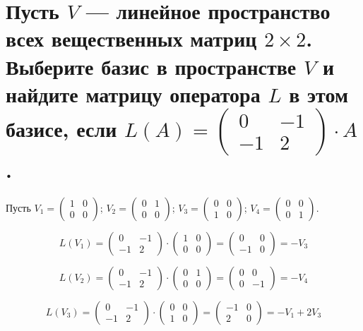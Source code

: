 \documentclass[12pt]{article}
\begin{document}
\begin{sloppypar}
    \section{Пусть $V$ — линейное пространство всех вещественных матриц $2 \times 2$. Выберите базис в пространстве $V$ и найдите матрицу оператора $L$ в этом базисе, если $L(A) = \begin{pmatrix}0 & -1 \\ -1 & 2\end{pmatrix} \cdot A$.}

    Пусть $V_1 = \begin{pmatrix} 1 & 0 \\ 0 & 0 \end{pmatrix}$;
    $V_2 = \begin{pmatrix} 0 & 1 \\ 0 & 0 \end{pmatrix}$;
    $V_3 = \begin{pmatrix} 0 & 0 \\ 1 & 0 \end{pmatrix}$;
    $V_4 = \begin{pmatrix} 0 & 0 \\ 0 & 1 \end{pmatrix}$.

    \[
        L(V_1) = \begin{pmatrix} 0 & -1 \\ -1 & 2 \end{pmatrix} \cdot \begin{pmatrix} 1 & 0 \\ 0 & 0 \end{pmatrix}
        = \begin{pmatrix}
            0  & 0 \\
            -1 & 0
        \end{pmatrix}
        = -V_3
    \]

    \[
        L(V_2) = \begin{pmatrix} 0 & -1 \\ -1 & 2 \end{pmatrix} \cdot \begin{pmatrix} 0 & 1 \\ 0 & 0 \end{pmatrix}
        = \begin{pmatrix}
            0 & 0  \\
            0 & -1
        \end{pmatrix}
        = -V_4
    \]

    \[
        L(V_3) = \begin{pmatrix} 0 & -1 \\ -1 & 2 \end{pmatrix} \cdot \begin{pmatrix} 0 & 0 \\ 1 & 0 \end{pmatrix}
        = \begin{pmatrix}
            -1 & 0 \\
            2  & 0
        \end{pmatrix}
        = -V_1 + 2V_3
    \]


\end{sloppypar}
\end{document}
